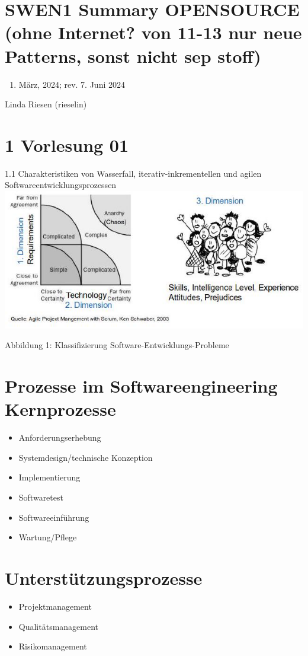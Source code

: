 \documentclass[10pt]{article}
\begin{document}
\section*{SWEN1 Summary OPENSOURCE (ohne Internet? von 11-13 nur neue Patterns, sonst nicht sep stoff)}
\begin{enumerate}
  \item März, 2024; rev. 7. Juni 2024
\end{enumerate}

Linda Riesen (rieselin)

\section*{1 Vorlesung 01}
1.1 Charakteristiken von Wasserfall, iterativ-inkrementellen und agilen Softwareentwicklungsprozessen\\
\includegraphics[max width=\textwidth, center]{2024_12_29_0d1d7b5551ea1b4b41bdg-01}

Abbildung 1: Klassifizierung Software-Entwicklungs-Probleme

\section*{Prozesse im Softwareengineering Kernprozesse}
\begin{itemize}
  \item Anforderungserhebung
  \item Systemdesign/technische Konzeption
  \item Implementierung
  \item Softwaretest
  \item Softwareeinführung
  \item Wartung/Pflege
\end{itemize}

\section*{Unterstützungsprozesse}
\begin{itemize}
  \item Projektmanagement
  \item Qualitätsmanagement
  \item Risikomanagement
\end{itemize}
\end{document}
